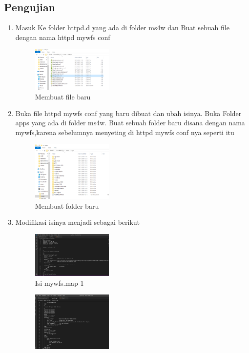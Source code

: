 \subsection{Pengujian}
\begin{enumerate}
  \item Masuk Ke folder httpd.d yang ada di folder ms4w dan  Buat sebuah file dengan nama httpd mywfs conf
  \hfill\break
    \begin{figure}[H]
		\includegraphics[width=4cm]{figures/1174004/4/7.PNG}
		\centering
		\caption{Membuat file baru}
    \end{figure}
  \item Buka file httpd mywfs conf yang baru dibuat dan ubah isinya. Buka Folder apps yang ada di folder ms4w. Buat sebuah folder baru disana dengan nama mywfs,karena sebelumnya menyeting di httpd mywfs conf nya seperti itu
  \hfill\break
    \begin{figure}[H]
		\includegraphics[width=4cm]{figures/1174004/4/8.PNG}
		\centering
		\caption{Membuat folder baru}
    \end{figure}
  \item Modifikasi isinya menjadi sebagai berikut
  \hfill\break
    \begin{figure}[H]
		\includegraphics[width=4cm]{figures/1174004/4/9.PNG}
		\centering
		\caption{Isi mywfs.map 1}
    \end{figure}
    \hfill\break
    \begin{figure}[H]
		\includegraphics[width=4cm]{figures/1174004/4/9b.PNG}

\end{figure}
\end{enumerate}
